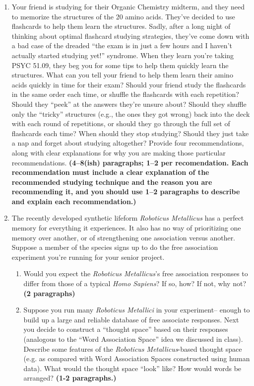 \documentclass[10pt]{article}
\begin{document}
\begin{enumerate}

\item Your friend is studying for their Organic Chemistry midterm, and they
need to memorize the structures of the 20 amino acids. They've decided to use
flashcards to help them learn the structures. Sadly, after a long night of
thinking about optimal flashcard studying strategies, they've come down with a
bad case of the dreaded ``the exam is in just a few hours and I haven't
actually started studying yet!'' syndrome. When they learn you're taking PSYC
51.09, they beg you for some tips to help them quickly learn the structures.
What can you tell your friend to help them learn their amino acids quickly in
time for their exam? Should your friend study the flashcards in the same order
each time, or shuffle the flashcards with each repetition? Should they ``peek''
at the answers they're unsure about? Should they shuffle only the ``tricky''
structures (e.g., the ones they got wrong) back into the deck with each round
of repetitions, or should they go through the full set of flashcards each time?
When should they stop studying? Should they just take a nap and forget about
studying altogether? Provide four recommendations, along with clear
explanations for why you are making those particular recommendations.
\textbf{(4--8(ish) paragraphs; 1--2 per recomendation. Each recommendation must
include a clear explanation of the recommended studying technique and the
reason you are recommending it, and you should use 1--2 paragraphs to describe
and explain each recommendation.)}

\item The recently developed synthetic lifeform \textit{Roboticus Metallicus} has a
  perfect memory for everything it experiences.  It also has no way of
  prioritizing one memory over another, or of strengthening one
  association versus another.  Suppose a member of the species signs
  up to do the free association experiment you're running for your
  senior project.
\begin{enumerate}
\item Would you expect the \textit{Roboticus Metallicus}'s free
  association responses to differ from those of a typical \textit{Homo
    Sapiens}?  If so, how?  If not, why not?  \textbf{(2 paragraphs)}
\item Suppose you run many \textit{Roboticus Metallici} in your
  experiment-- enough to build up a large and reliable database of free
  associate responses.  Next you decide to construct a ``thought space''
  based on their responses (analogous to the ``Word Association
  Space'' idea we discussed in class).  Describe some features of the
  \textit{Roboticus Metallicus}-based thought space (e.g. as compared
  with Word Association Spaces constructed using human data).
  What would the thought space ``look'' like?  How would words be
  arranged?
  \textbf{(1-2 paragraphs.)}
\end{enumerate}
\end{enumerate}
\end{document}
